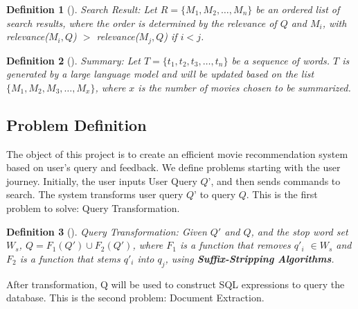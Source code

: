\documentclass[journal]{IEEEtran}
\theoremstyle{mydefstyle}
\newtheorem{definition}{Definition}[section]
\begin{document}
\begin{adjustwidth}{0.75cm}{} \begin{definition}[]
\textit{Search Result:} Let \( R = \{M_1, M_2, \ldots, M_n\} \) be an ordered list of search results, where the order is determined by the relevance of \( Q \) and \( M_i \), with relevance(\( M_i, Q \)) \(>\) relevance(\( M_j, Q \)) if \( i < j \).
\end{definition} \end{adjustwidth}

\begin{adjustwidth}{0.75cm}{} \begin{definition}[]
\textit{Summary:} Let \( T = \{t_1, t_2, t_3, \ldots, t_n\} \) be a sequence of words. \( T \) is generated by a large language model and will be updated based on the list \( \{M_1, M_2, M_3, \ldots, M_x\} \), where \(x\) is the number of movies chosen to be summarized.

\end{definition} \end{adjustwidth}

\subsection{Problem Definition}
The object of this project is to create an efficient movie recommendation system based on user’s query and feedback. We define problems starting with the user journey. Initially, the user inputs User Query \(Q’\), and then sends commands to search. The system transforms user query \(Q’\) to query \(Q\). This is the first problem to solve: Query Transformation.

\begin{adjustwidth}{0.75cm}{} \begin{definition}[]
\textit{Query Transformation:} Given \( Q' \) and \( Q \), and the stop word set \( W_s \), \( Q = F_1(Q') \cup F_2(Q') \), where \( F_1 \) is a function that removes \( q'_i \) \(\in W_s \) and \( F_2 \) is a function that stems \( q'_i \) into \( q_j \), using \textbf{Suffix-Stripping Algorithms}.

\end{definition} \end{adjustwidth}

\vspace{10pt} 

After transformation, Q will be used to construct SQL expressions to query the database. This is the second problem: Document Extraction.
\end{document}
